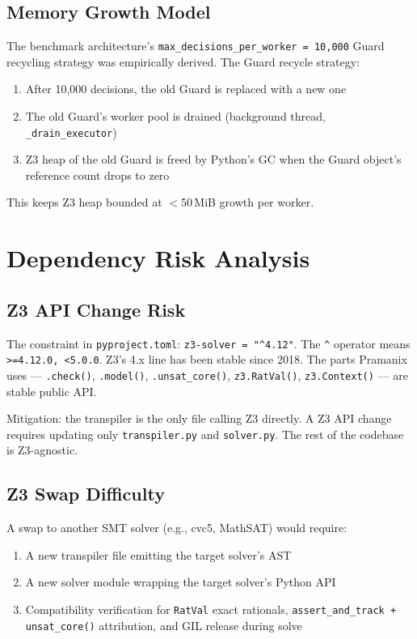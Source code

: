 \documentclass[12pt,a4paper,oneside]{report}
\newcommand{\fname}[1]{\texttt{#1}}          %
\newcommand{\code}[1]{\texttt{#1}}           %
\begin{document}
\section{Memory Growth Model}

The benchmark architecture's \code{max\_decisions\_per\_worker = 10{,}000}
Guard recycling strategy was empirically derived. The Guard recycle strategy:

\begin{enumerate}
  \item After 10,000 decisions, the old Guard is replaced with a new one
  \item The old Guard's worker pool is drained (background thread,
        \code{\_drain\_executor})
  \item Z3 heap of the old Guard is freed by Python's GC when the Guard
        object's reference count drops to zero
\end{enumerate}

This keeps Z3 heap bounded at ${<}$50\,MiB growth per worker.

\chapter{Dependency Risk Analysis}

\section{Z3 API Change Risk}

The constraint in \fname{pyproject.toml}: \code{z3-solver = "\^{}4.12"}.
The \code{\^{}} operator means \code{>=4.12.0, <5.0.0}. Z3's 4.x line has
been stable since 2018. The parts Pramanix uses --- \code{.check()},
\code{.model()}, \code{.unsat\_core()}, \code{z3.RatVal()},
\code{z3.Context()} --- are stable public API.

Mitigation: the transpiler is the only file calling Z3 directly. A Z3 API
change requires updating only \fname{transpiler.py} and \fname{solver.py}.
The rest of the codebase is Z3-agnostic.

\section{Z3 Swap Difficulty}

A swap to another SMT solver (e.g., cvc5, MathSAT) would require:
\begin{enumerate}
  \item A new transpiler file emitting the target solver's AST
  \item A new solver module wrapping the target solver's Python API
  \item Compatibility verification for \code{RatVal} exact rationals,
        \code{assert\_and\_track + unsat\_core()} attribution, and GIL release
        during solve
\end{enumerate}
\end{document}
